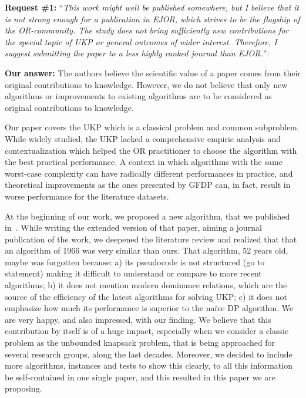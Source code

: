\documentclass{elsarticle}
\begin{document}
\textbf{Request \#1:} ``\textit{This work might well be published somewhere, but I believe that it is not strong enough for a publication in EJOR, which strives to be the flagship of the OR-community. The study does not bring sufficiently new contributions for the special topic of UKP or general outcomes of wider interest. Therefore, I suggest submitting the paper to a less highly ranked journal than EJOR.}'':

\textbf{Our answer:} 
The authors believe the scientific value of a paper comes from their original contributions to knowledge.
However, we do not believe that only new algorithms or improvements to existing algorithms are to be considered as original contributions to knowledge.

Our paper covers the UKP which is a classical problem and common subproblem.
While widely studied, the UKP lacked a comprehensive empiric analysis and contextualization which helped the OR practitioner to choose the algorithm with the best practical performance.
A context in which algorithms with the same worst-case complexity can have radically different performances in practice, and theoretical improvements as the ones presented by GFDP can, in fact, result in worse performance for the literature datasets.

At the beginning of our work, we proposed a new algorithm, that we published in~\cite{sea2016}.
While writing the extended version of that paper, aiming a journal publication of the work, we deepened the literature review and realized that that an algorithm of 1966 was very similar than ours.
That algorithm, 52 years old, maybe was forgotten because: a) its pseudocode is not structured (go to statement) making it difficult to understand or compare to more recent algorithms; b) it does not mention modern dominance relations, which are the source of the efficiency of the latest algorithms for solving UKP; c) it does not emphasize how much its performance is superior to the naïve DP algorithm.
We are very happy, and also impressed, with our finding.
We believe that this contribution by itself is of a huge impact, especially when we consider a classic problem as the unbounded knapsack problem, that is being approached for several research groups, along the last decades. 
Moreover, we decided to include more algorithms, instances and tests to show this clearly, to all this information be self-contained in one single paper, and this resulted in this paper we are proposing.
\end{document}
